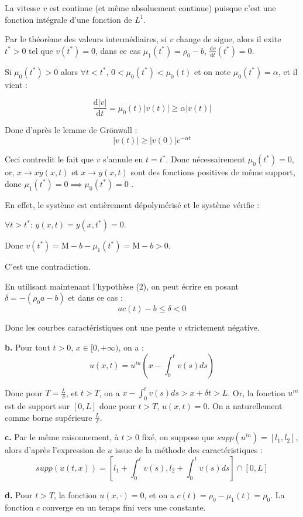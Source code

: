 \documentclass[a4paper]{article}
\newcommand{\mass}{\mathrm{M}}
\newcommand{\dep}{b}
\begin{document}
La vitesse $v$ est continue (et même absoluement continue)
puisque c'est une fonction intégrale d'une fonction de $L^1$.

Par le théorème des valeurs intermédiaires, si $v$ change de signe,
alors il exite $t^*>0$ tel que $v(t^*)= 0$, 
	dans ce cas $\mu_1(t^*)= \rho_0 -\dep $, 
	$\frac{\mathrm{d} v }{\mathrm{d}t} (t^*) = 0$.
	
	Si $\mu_0(t^*)>0$ alors $\forall t<t^*$, $0<\mu_0(t^*)<\mu_0(t)$ et on note $ \mu_0(t^*)= \alpha$, et il vient :
	
	\[ \frac{\mathrm{d} |v| }{\mathrm{d}t} = \mu_0(t)|v(t)| \geq \alpha |v(t)| \]
	
	Donc d'après le lemme de Grönwall :
	\[ |v(t)| \geq |v(0)| e^{-\alpha t} \]
	
	Ceci contredit le fait que $v$ s'annule en $t=t^*$.
	Donc nécessairement $\mu_0(t^*) = 0$, 
	or, $x \to xy (x,t)$ et $x \to y(x,t)$ sont des fonctions positives de même support,
	donc $\mu_1(t^*) =0 \implies \mu_0(t^*)=0$ .
	
	En effet, le système est entièrement dépolymérisé et le système vérifie :
	
	$\forall t>t^*$:  $y(x,t)=y(x,t^*)= 0$.
	
	Donc $v(t^*) = \mass - \dep - \mu_1(t^*) = \mass- \dep > 0$.
	
	C'est une contradiction.	

En utilisant maintenant l'hypothèse (2), on peut écrire 
en posant $\delta = -(\rho_0 a -b) $ et dans ce cas :
\[ ac(t)-b \leq \delta <0 \] 

Donc les courbes caractéristiques ont une pente $v$ strictement négative.

\textbf{b.}
Pour tout $t>0$, $x \in[0,+\infty)$, on a :
\[ u(x,t) = u^{in}(x- \int_0^t v(s)ds) \]

Donc pour $T = \displaystyle \frac{L}{\delta}$, et $t>T$, on a $x- \int_0^t v(s)ds > x+\delta t >L $. Or, la fonction $u^{in}$ est de support sur $[0,L]$ 
donc pour $t>T$, $u(x,t)=0$.
On a naturellement comme borne supérieure $\displaystyle \frac{L}{\delta}$.

\textbf{c.}
Par le même raisonnement, à $t>0$ fixé, 
on suppose que $supp(u^{in})= [l_1,l_2]$,
alors  d'après l'expression de $u$ issue de la méthode des caractéristiques :
\[supp (u(t,x)) = [l_1 + \int_0^t v(s) , l_2 + \int_0^t v(s) ds] \cap [0,L]\] 

\textbf{d.}
Pour $t>T$, la fonction $u(x, \cdot)=0$, 
et on a $c(t) = \rho_0 - \mu_1(t) = \rho_0$.
La fonction $c$ converge en un temps fini vers une constante.
\end{document}
